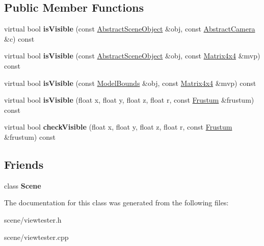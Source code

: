 \subsection*{Public Member Functions}
\begin{DoxyCompactItemize}
\item 
\hypertarget{class_tempest_1_1_view_tester_ab8e37b3f87bc5269ee4e87937a5e94c2}{virtual bool {\bfseries is\+Visible} (const \hyperlink{class_tempest_1_1_abstract_scene_object}{Abstract\+Scene\+Object} \&obj, const \hyperlink{class_tempest_1_1_abstract_camera}{Abstract\+Camera} \&c) const }\label{class_tempest_1_1_view_tester_ab8e37b3f87bc5269ee4e87937a5e94c2}

\item 
\hypertarget{class_tempest_1_1_view_tester_a00bb73d6f3203e3c0240bb742b0c9f8a}{virtual bool {\bfseries is\+Visible} (const \hyperlink{class_tempest_1_1_abstract_scene_object}{Abstract\+Scene\+Object} \&obj, const \hyperlink{class_tempest_1_1_matrix4x4}{Matrix4x4} \&mvp) const }\label{class_tempest_1_1_view_tester_a00bb73d6f3203e3c0240bb742b0c9f8a}

\item 
\hypertarget{class_tempest_1_1_view_tester_a049b31757311dc1f8088c0b385d2be7d}{virtual bool {\bfseries is\+Visible} (const \hyperlink{struct_tempest_1_1_model_bounds}{Model\+Bounds} \&obj, const \hyperlink{class_tempest_1_1_matrix4x4}{Matrix4x4} \&mvp) const }\label{class_tempest_1_1_view_tester_a049b31757311dc1f8088c0b385d2be7d}

\item 
\hypertarget{class_tempest_1_1_view_tester_a545bd2e19a1dfab48625ccd6460fd1bd}{virtual bool {\bfseries is\+Visible} (float x, float y, float z, float r, const \hyperlink{class_tempest_1_1_frustum}{Frustum} \&frustum) const }\label{class_tempest_1_1_view_tester_a545bd2e19a1dfab48625ccd6460fd1bd}

\item 
\hypertarget{class_tempest_1_1_view_tester_a5cab517b391a9afa583df4adf7f9e868}{virtual bool {\bfseries check\+Visible} (float x, float y, float z, float r, const \hyperlink{class_tempest_1_1_frustum}{Frustum} \&frustum) const }\label{class_tempest_1_1_view_tester_a5cab517b391a9afa583df4adf7f9e868}

\end{DoxyCompactItemize}
\subsection*{Friends}
\begin{DoxyCompactItemize}
\item 
\hypertarget{class_tempest_1_1_view_tester_a032858ae1fe02d2d1170981c2af2d67c}{class {\bfseries Scene}}\label{class_tempest_1_1_view_tester_a032858ae1fe02d2d1170981c2af2d67c}

\end{DoxyCompactItemize}


The documentation for this class was generated from the following files\+:\begin{DoxyCompactItemize}
\item 
scene/viewtester.\+h\item 
scene/viewtester.\+cpp\end{DoxyCompactItemize}
